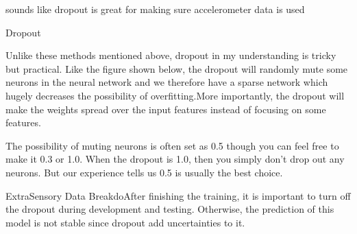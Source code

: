 \documentclass{UoNMCHA}
\numberwithin{equation}{section}
\begin{document}
sounds like dropout is great for making sure accelerometer data is used

Dropout

Unlike these methods mentioned above, dropout in my understanding is tricky but practical. Like the figure shown below, the dropout will randomly mute some neurons in the neural network and we therefore have a sparse network which hugely decreases the possibility of overfitting.More importantly, the dropout will make the weights spread over the input features instead of focusing on some features.

The possibility of muting neurons is often set as 0.5 though you can feel free to make it 0.3 or 1.0. When the dropout is 1.0, then you simply don't drop out any neurons. But our experience tells us 0.5 is usually the best choice.

ExtraSensory Data BreakdoAfter finishing the training, it is important to turn off the dropout during development and testing. Otherwise, the prediction of this model is not stable since dropout add uncertainties to it.


\newpage
\end{document}
